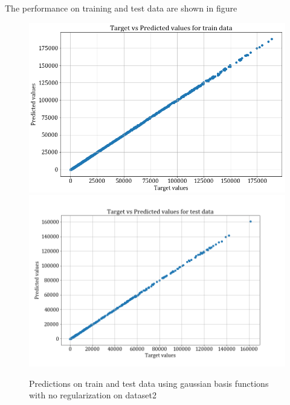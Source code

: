\documentclass[12pt,a4paper]{article}
\newcommand{\noi}{\noindent}
\begin{document}
\noi
The performance on training and test data are shown in figure 
\begin{figure}[H]
    \centering
    \includegraphics[scale=0.4]{images/train_ds2_noreg.png}
    \includegraphics[scale=0.4]{images/test_ds2_noreg.png}
    \caption{Predictions on train and test data using gaussian basis functions with no regularization on dataset2}
    \label{fig:train_teat_ds2_noreg_gaus}
\end{figure}
\end{document}
